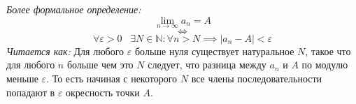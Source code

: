 \documentclass[11pt,a4paper]{article}
\newcommand\NN{{\mathbb N}}
\begin{document}
    \textit{Более формальное определение:}
    \begin{equation*}
        \lim_{n \to \infty} a_n = A
    \end{equation*}
    \begin{equation*}
        \iff
    \end{equation*}
    \begin{equation*}
        \forall \varepsilon > 0 \;\;\; \exists N \in \NN: \forall n > N \implies |a_n - A| < \varepsilon
    \end{equation*}
    \textit{Читается как:} Для любого $\varepsilon$ больше нуля существует натуральное $N$, такое что для любого $n$ больше чем это $N$ следует, что разница между $a_n$ и $A$ по модулю меньше $\varepsilon$. То есть начиная с некоторого $N$ все члены последовательности попадают в $\varepsilon$ окресность точки $A$.
    
\end{document}
